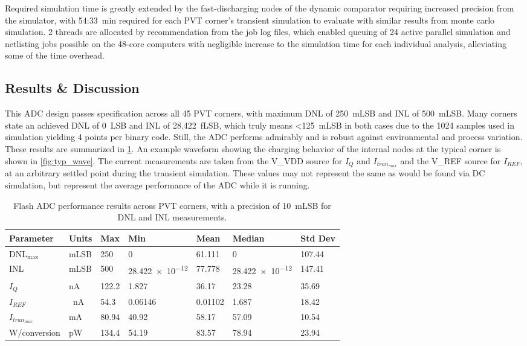 \documentclass[11pt,letterpaper]{article}
\begin{document}
Required simulation time is greatly extended by the fast-discharging nodes of the dynamic comparator requiring increased precision from the simulator, with 54:\qty{33}{min} required for each PVT corner's transient simulation to evaluate with similar results from monte carlo simulation. 2 threads are allocated by recommendation from the job log files, which enabled queuing of 24 active parallel simulation and netlisting jobs possible on the 48-core computers with negligible increase to the simulation time for each individual analysis, alleviating some of the time overhead.

\subsection {Results \& Discussion}

This ADC design passes specification across all 45 PVT corners, with maximum DNL of \qty{250}{mLSB} and INL of \qty{500}{mLSB}. Many corners state an achieved DNL of \qty{0}{LSB} and INL of \qty{28.422}{fLSB}, which truly means <\qty{125}{mLSB} in both cases due to the 1024 samples used in simulation yielding 4 points per binary code. Still, the ADC performs admirably and is robust against environmental and process variation. These results are summarized in \cref{tab:pvt_results}. An example waveform showing the charging behavior of the internal nodes at the typical corner is shown in \cref{fig:typ_wave}. The current measurements are taken from the V\_VDD source for \(I_Q\) and \(I_{tran_{max}}\) and the V\_REF source for \(I_{REF}\), at an arbitrary settled point during the transient simulation. These values may not represent the same as would be found via DC simulation, but represent the average performance of the ADC while it is running.

\begin{table}[htbp!]
    \centering
    \begin{tabular}{lllllll}
    \toprule
        \textbf{Parameter} & \textbf{Units} & \textbf{Max} & \textbf{Min} & \textbf{Mean} & \textbf{Median} & \textbf{Std Dev}\\
    \midrule
        \(\mathrm{DNL_{max}}\) & mLSB & 250 & 0 & 61.111 & 0 & 107.44 \\
        INL & mLSB & 500 & \qty{28.422e-12}{} & 77.778 & \qty{28.422e-12}{} & 147.41 \\
        \(I_Q\) & nA & 122.2 & 1.827 & 36.17 & 23.28 & 35.69 \\
        \(I_{REF}\) & \qty{}{\nA} & 54.3 & 0.06146 & 0.01102 & 1.687 & 18.42\\
        \(I_{tran_{max}}\) & mA & 80.94 & 40.92 & 58.17 & 57.09 & 10.54\\
        W/conversion & pW & 134.4 & 54.19 & 83.57 & 78.94 &  23.94\\
    \bottomrule
    \end{tabular}
    \caption{Flash ADC performance results across PVT corners, with a precision of \qty{10}{mLSB} for DNL and INL measurements.}\label{tab:pvt_results}
\end{table}
\end{document}
